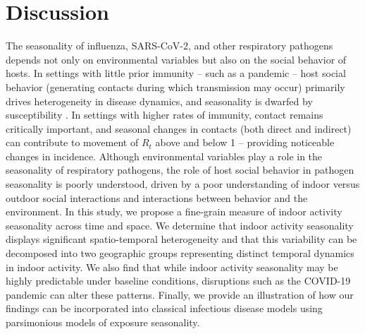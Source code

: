 \documentclass{article}
\begin{document}
\section*{Discussion}
The seasonality of influenza, SARS-CoV-2, and other respiratory pathogens depends not only on environmental variables but also on the social behavior of hosts. In settings with little prior immunity -- such as a pandemic -- host social behavior (generating contacts during which transmission may occur) primarily drives heterogeneity in disease dynamics, and seasonality is dwarfed by susceptibility \cite{baker2020susceptible}. In settings with higher rates of immunity, contact remains critically important, and seasonal changes in contacts (both direct and indirect) can contribute to movement of $R_{t}$ above and below 1 -- providing noticeable changes in incidence. Although environmental variables play a role in the seasonality of respiratory pathogens, the role of host social behavior in pathogen seasonality is poorly understood, driven by a poor understanding of indoor versus outdoor social interactions and interactions between behavior and the environment. In this study, we propose a fine-grain measure of indoor activity seasonality across time and space. We determine that indoor activity seasonality displays significant spatio-temporal heterogeneity and that this variability can be decomposed into two geographic groups representing distinct temporal dynamics in indoor activity. We also find that while indoor activity seasonality may be highly predictable under baseline conditions, disruptions such as the COVID-19 pandemic can alter these patterns. Finally, we provide an illustration of how our findings can be incorporated into classical infectious disease models using parsimonious models of exposure seasonality.
\end{document}
